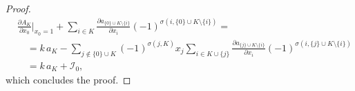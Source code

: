 \documentclass[a4paper, 11pt]{amsart}
\theoremstyle{plain}
\numberwithin{theorem}{section}
\theoremstyle{definition}
\newcommand{\cI}{\mathcal{I}}
\begin{document}
\begin{proof}
\begin{align*}
 &\frac{\partial A_{K}}{\partial x_0}\Big|_{x_0= 1} + \sum_{i\in K} \frac{\partial a_{\{0\} \cup K  \setminus \{i\} }}{\partial x_i} (-1)^{\sigma(i,\{0\} \cup K\setminus \{i\})} = \\
  &\quad     = k\, a_K - \sum_{j \not\in \{0\} \cup K}(-1)^{\sigma(j,K)} x_j\sum_{i\in K\cup \{j\}} \frac{\partial a_{\{j\} \cup K\setminus \{i\}}}{\partial x_i}(-1)^{\sigma(i,\{j\}\cup K\setminus \{i\})} \\
&\quad = k\, a_K + \cI_0,
\end{align*}
which concludes the proof.
\end{proof}
\end{document}
